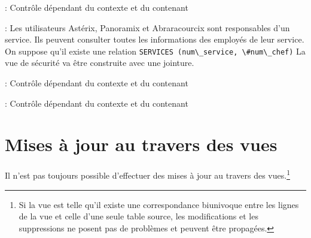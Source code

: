 \documentclass[10pt]{beamer}
\begin{document}
\begin{frame}{\secname : \subsecname}
    Contrôle dépendant du contexte et du contenant
    
\end{frame}

\begin{frame}{\secname : \subsecname}
    Les utilisateurs Astérix,  Panoramix et Abraracourcix sont responsables d'un service. Ils peuvent consulter toutes les informations des employés de leur service.
    On suppose qu'il existe une relation
    \lstinline[language=plsql]!SERVICES (num\_service, \#num\_chef)!
    La vue de sécurité va être construite avec une jointure.
\end{frame}

\begin{frame}{\secname : \subsecname}
    Contrôle dépendant du contexte et du contenant
    
\end{frame}

\begin{frame}{\secname : \subsecname}
    Contrôle dépendant du contexte et du contenant
    
\end{frame}

\section{Mises à jour au travers des vues}
\begin{frame}{\secname}
    Il n'est pas toujours possible d'effectuer des mises à jour au travers des vues.\footnote{Si la vue est telle qu'il existe une correspondance biunivoque entre les lignes de la vue et celle d'une seule table source, les modifications et les suppressions ne posent pas de problèmes et peuvent être propagées.
    }
\end{frame}
\end{document}
